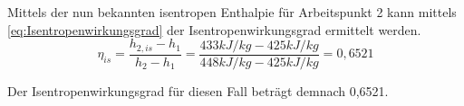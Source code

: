     Mittels der nun bekannten isentropen Enthalpie für Arbeitspunkt 2 kann mittels \autoref{eq:Isentropenwirkungsgrad} der Isentropenwirkungsgrad ermittelt werden.
\begin{equation}
    \eta_{is}=\frac{h_{2,is}-h_{1}}{h_{2}-h_{1}}=\frac{433 kJ/kg-425 kJ/kg}{448 kJ/kg-425 kJ/kg}=0,6521
    \label{eq:Isentropenwirkungsgrad}
\end{equation}

Der Isentropenwirkungsgrad für diesen Fall beträgt demnach 0,6521.\\